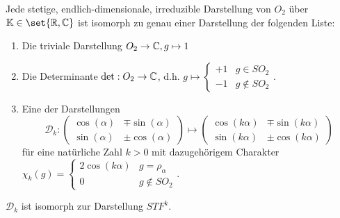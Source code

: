 \begin{theorem}
Jede stetige, endlich-dimensionale, irreduzible Darstellung von $O_2$ über $\IK\in\set{\IR,\IC}$ ist isomorph zu genau einer Darstellung der folgenden Liste:
\begin{enumerate}
\item Die triviale Darstellung $O_2\to\mathbb{C}, g\mapsto 1$
\item Die Determinante $\det: O_2\to\mathbb{C}$, d.h. $g\mapsto\begin{cases}+1&g\in SO_2 \\ -1&g\notin SO_2\end{cases}$.
\item Eine der Darstellungen
\[\mathcal{D}_k : \begin{pmatrix}\cos(\alpha)&\mp\sin(\alpha)\\\sin(\alpha)&\pm\cos(\alpha)\end{pmatrix} \mapsto \begin{pmatrix}\cos(k\alpha)&\mp\sin(k\alpha)\\\sin(k\alpha)&\pm\cos(k\alpha)\end{pmatrix}\]
für eine natürliche Zahl $k>0$ mit dazugehörigem Charakter $\chi_k(g) = \begin{cases} 2\cos(k\alpha) & g=\rho_\alpha \\ 0 & g\notin SO_2\end{cases}$.
\end{enumerate}
$\mathcal{D}_k$ ist isomorph zur Darstellung $STF^k$.
\end{theorem}
